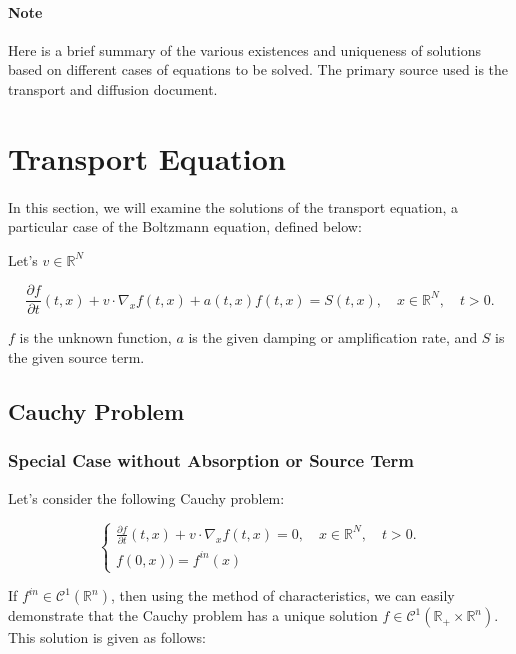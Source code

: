 \documentclass[onecolumn, 12pt, a4paper]{article}
\begin{document}
\newpage

\paragraph{Note} Here is a brief summary of the various existences and uniqueness of solutions based on different cases of equations to be solved. The primary source used is the transport and diffusion document.

\section{Transport Equation}

\paragraph{}
In this section, we will examine the solutions of the transport equation, a particular case of the Boltzmann equation, defined below:



Let's $v \in \mathbb{R}^N$

\begin{equation} \label{transport}
\frac{\partial f}{\partial t}(t,x)+v \cdot \nabla_x f(t,x) + a(t,x)f(t,x) = S(t,x), \quad x \in \mathbb{R}^N, \quad t>0.
\end{equation}


$f$ is the unknown function, $a$ is the given damping or amplification rate, and $S$ is the given source term.

\subsection{Cauchy Problem}
\subsubsection{Special Case without Absorption or Source Term}

Let's consider the following Cauchy problem:

\[
\begin{cases}
\frac{\partial f}{\partial t}(t,x)+v \cdot \nabla_x f(t,x)=0, \quad x \in \mathbb{R}^N, \quad t>0.\\
f(0,x)) = f^{in}(x)
\end{cases}
\]

If $f^{in} \in \mathcal{C}^1(\mathbb{R}^n)$, then using the method of characteristics, we can easily demonstrate that the Cauchy problem has a unique solution $f \in \mathcal{C}^1(\mathbb{R}_+ \times \mathbb{R}^n)$. This solution is given as follows:
\end{document}
